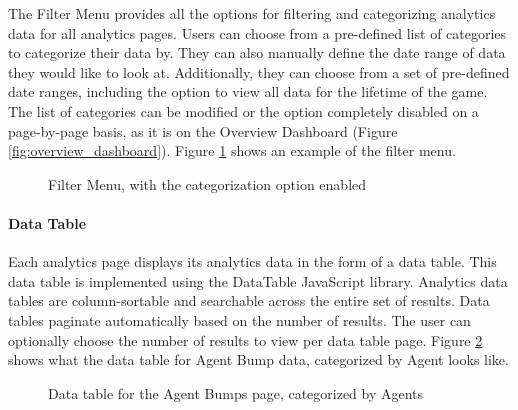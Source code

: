 The Filter Menu provides all the options for filtering and categorizing analytics data for all analytics pages. Users can choose from a pre-defined list of categories to categorize their data by. They can also manually define the date range of data they would like to look at. Additionally, they can choose from a set of pre-defined date ranges, including the option to view all data for the lifetime of the game. The list of categories can be modified or the option completely disabled on a page-by-page basis, as it is on the Overview Dashboard (Figure \ref{fig:overview_dashboard}). Figure \ref{fig:filter_menu} shows an example of the filter menu. 

\begin{figure}[hbt]
	\caption[Analytics Site: Filter Menu]{\label{fig:filter_menu} Filter Menu, with the categorization option enabled}
\end{figure}

\paragraph{Data Table}

Each analytics page displays its analytics data in the form of a data table. This data table is implemented using the DataTable JavaScript library. Analytics data tables are column-sortable and searchable across the entire set of results. Data tables paginate automatically based on the number of results. The user can optionally choose the number of results to view per data table page. Figure \ref{fig:data_table} shows what the data table for Agent Bump data, categorized by Agent looks like. 

\begin{figure}[hbt]
	\caption[Analytics Site: Agent Bumps Data Table]{\label{fig:data_table} Data table for the Agent Bumps page, categorized by Agents}
\end{figure}

